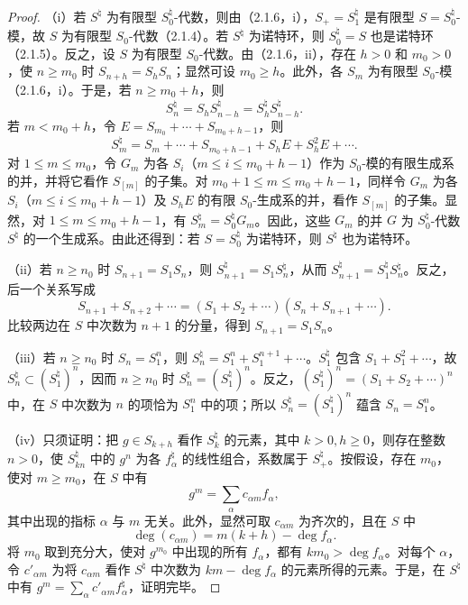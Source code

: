 \begin{proof}
（i）若 $S^{\natural}$ 为有限型 $S_0^{\natural}$-代数，则由（2.1.6，i），$S_+=S_1^{\natural}$ 是有限型 $S=S_0^{\natural}$-模，故 $S$ 为有限型 $S_0$-代数（2.1.4）。若 $S^{\natural}$ 为诺特环，则 $S_0^{\natural}=S$ 也是诺特环（2.1.5）。反之，设 $S$ 为有限型 $S_0$-代数。由（2.1.6，ii），存在 $h>0$ 和 $m_0>0$，使 $n\geq m_0$ 时 $S_{n+h}=S_hS_n$；显然可设 $m_0\geq h$。此外，各 $S_m$ 为有限型 $S_0$-模（2.1.6，i）。于是，若 $n\geq m_0+h$，则
\[
S_n^{\natural}=S_hS_{n-h}^{\natural}=S_h^{\natural}S_{n-h}^{\natural}.
\]
若 $m<m_0+h$，令 $E=S_{m_0}+\cdots+S_{m_0+h-1}$，则
\[
S_m^{\natural}=S_m+\cdots+S_{m_0+h-1}+S_hE+S_h^2E+\cdots.
\]
对 $1\leq m\leq m_0$，令 $G_m$ 为各 $S_i$（$m\leq i\leq m_0+h-1$）作为 $S_0$-模的有限生成系的并，并将它看作 $S_{[m]}$ 的子集。对 $m_0+1\leq m\leq m_0+h-1$，同样令 $G_m$ 为各 $S_i$（$m\leq i\leq m_0+h-1$）及 $S_hE$ 的有限 $S_0$-生成系的并，看作 $S_{[m]}$ 的子集。显然，对 $1\leq m\leq m_0+h-1$，有 $S_m^{\natural}=S_0^{\natural}G_m$。因此，这些 $G_m$ 的并 $G$ 为 $S_0^{\natural}$-代数 $S^{\natural}$ 的一个生成系。由此还得到：若 $S=S_0^{\natural}$ 为诺特环，则 $S^{\natural}$ 也为诺特环。

（ii）若 $n\geq n_0$ 时 $S_{n+1}=S_1S_n$，则 $S_{n+1}^{\natural}=S_1S_n^{\natural}$，从而 $S_{n+1}^{\natural}=S_1^{\natural}S_n^{\natural}$。反之，后一个关系写成
\[
S_{n+1}+S_{n+2}+\cdots=(S_1+S_2+\cdots)(S_n+S_{n+1}+\cdots).
\]
比较两边在 $S$ 中次数为 $n+1$ 的分量，得到 $S_{n+1}=S_1S_n$。

（iii）若 $n\geq n_0$ 时 $S_n=S_1^n$，则 $S_n^{\natural}=S_1^n+S_1^{n+1}+\cdots$。$S_1^{\natural}$ 包含 $S_1+S_1^2+\cdots$，故 $S_n^{\natural}\subset(S_1^{\natural})^n$，因而 $n\geq n_0$ 时 $S_n^{\natural}=(S_1^{\natural})^n$。反之，$(S_1^{\natural})^n=(S_1+S_2+\cdots)^n$ 中，在 $S$ 中次数为 $n$ 的项恰为 $S_1^n$ 中的项；所以 $S_n^{\natural}=(S_1^{\natural})^n$ 蕴含 $S_n=S_1^n$。

（iv）只须证明：把 $g\in S_{k+h}$ 看作 $S_k^{\natural}$ 的元素，其中 $k>0,h\geq0$，则存在整数 $n>0$，使 $S_{kn}^{\natural}$ 中的 $g^n$ 为各 $f_\alpha^{\natural}$ 的线性组合，系数属于 $S_+^{\natural}$。按假设，存在 $m_0$，使对 $m\geq m_0$，在 $S$ 中有
\[
g^m=\sum_\alpha c_{\alpha m}f_\alpha,
\]
其中出现的指标 $\alpha$ 与 $m$ 无关。此外，显然可取 $c_{\alpha m}$ 为齐次的，且在 $S$ 中
\[
\deg(c_{\alpha m})=m(k+h)-\deg f_\alpha.
\]
将 $m_0$ 取到充分大，使对 $g^{m_0}$ 中出现的所有 $f_\alpha$，都有 $km_0>\deg f_\alpha$。对每个 $\alpha$，令 $c'_{\alpha m}$ 为将 $c_{\alpha m}$ 看作 $S^{\natural}$ 中次数为 $km-\deg f_\alpha$ 的元素所得的元素。于是，在 $S^{\natural}$ 中有 $g^m=\sum_\alpha c'_{\alpha m}f_\alpha^{\natural}$，证明完毕。
\end{proof}

